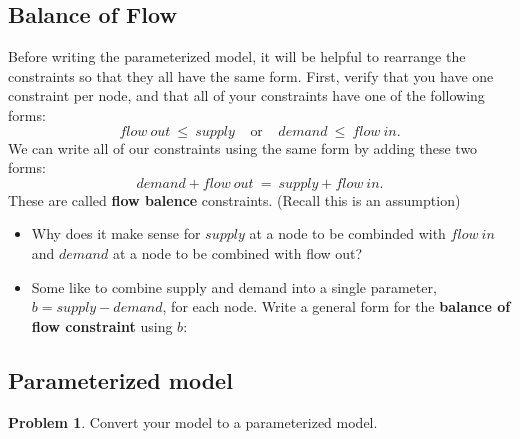 \documentclass[11pt]{article}
\theoremstyle{definition}
\newtheorem{problem}{Problem}
\begin{document}
\newpage

\subsection{Balance of Flow}

Before writing the parameterized model, it will be helpful to rearrange the constraints so that they all have the same form.  First, verify that you have one constraint per node, and that all of your constraints have one of the following  forms:
\[
flow~out ~\leq~ supply  ~~~~~\text{or}~~~~~  demand ~\leq~ flow~in.
\]
We can write all of our constraints using the same form by adding these two forms:
\[
demand + flow~out~ = ~ supply + flow~in.
\]
These are called \textbf{flow balence} constraints.  (Recall this is an assumption)

\begin{itemize}
\item Why does it make sense for $supply$ at a node to be combinded with $flow~in$ and $demand$ at a node to be combined with flow out?\vspace{2in}
\item Some like to combine supply and demand into a single parameter, $b = supply - demand$, for each node. Write a general form for the \textbf{balance of flow constraint} using $b$:
\vspace{2in}
\end{itemize}
\newpage

\subsection{Parameterized model}

\begin{problem}
Convert your model to a parameterized model. 
\end{problem}
\end{document}
